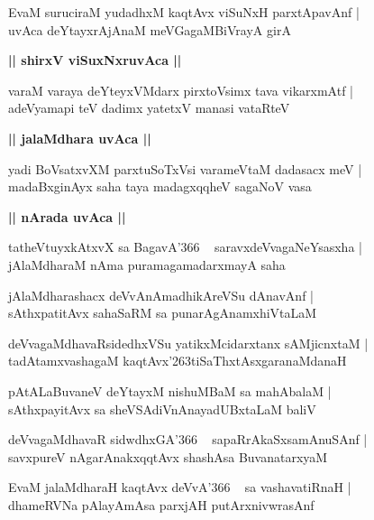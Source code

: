 \documentclass[twoside,12pt,openright]{book}
\def\S{\char'263}
\newcounter{shloka}[chapter]
\def\uvaca#1{\centerline{{\large\textbf{#1}}}}
\begin{document}
\begin{shloka}%
EvaM suruciraM yudadhxM kaqtAvx viSuNxH parxtApavAnf |\\ 
uvAca deYtayxrAjAnaM meVGagaMBiVrayA girA
\end{shloka}

\uvaca{|| shirxV viSuxNxruvAca ||}

\begin{shloka}%
varaM varaya deYteyxVMdarx pirxtoVsimx tava vikarxmAtf |\\
adeVyamapi teV dadimx yatetxV manasi vataRteV 
\end{shloka}

\uvaca{|| jalaMdhara uvAca ||}

\begin{shloka}%
yadi BoVsatxvXM parxtuSoTxVsi varameVtaM dadasacx meV |\\
madaBxginAyx saha taya madagxqqheV sagaNoV vasa
\end{shloka}

\uvaca{|| nArada uvAca ||}

\begin{shloka}%
tatheVtuyxkAtxvX sa BagavA\char'366 ~ saravxdeVvagaNeYsasxha |\\
jAlaMdharaM nAma puramagamadarxmayA saha 
\end{shloka}

\begin{shloka}%
jAlaMdharashacx deVvAnAmadhikAreVSu dAnavAnf |\\
sAthxpatitAvx sahaSaRM sa punarAgAnamxhiVtaLaM
\end{shloka}

\begin{shloka}%
deVvagaMdhavaRsidedhxVSu yatikxMcidarxtanx sAMjicnxtaM |\\
tadAtamxvashagaM kaqtAvx\S tiSaThxtAsxgaranaMdanaH 
\end{shloka}

\begin{shloka}%
pAtALaBuvaneV deYtayxM nishuMBaM sa mahAbalaM |\\
sAthxpayitAvx sa sheVSAdiVnAnayadUBxtaLaM baliV 
\end{shloka}

\begin{shloka}%
deVvagaMdhavaR sidwdhxGA\char'366 ~ sapaRrAkaSxsamAnuSAnf |\\
savxpureV nAgarAnakxqqtAvx shashAsa BuvanatarxyaM 
\end{shloka}

\begin{shloka}%
EvaM jalaMdharaH kaqtAvx deVvA\char'366 ~ sa vashavatiRnaH |\\
dhameRVNa pAlayAmAsa parxjAH putArxnivwrasAnf 
\end{shloka}
\end{document}
